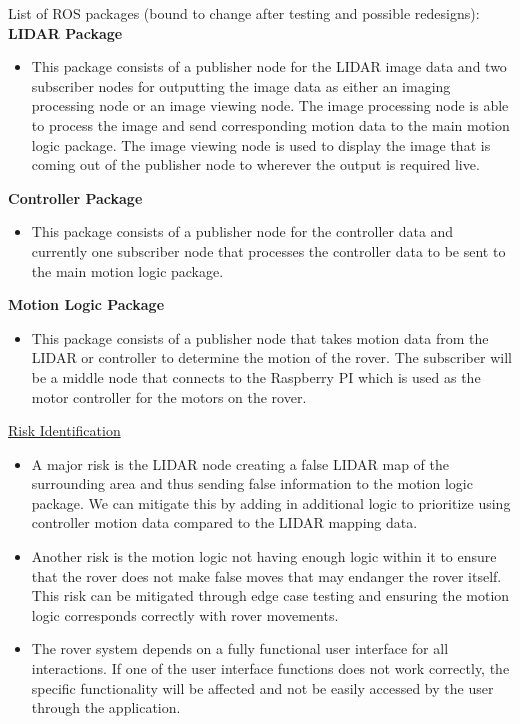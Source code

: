 \documentclass[a4paper, 10pt]{article}
\begin{document}
List of ROS packages (bound to change after testing and possible redesigns): \\

\textbf{LIDAR Package}
\begin{itemize}
\item
	This package consists of a publisher node for the LIDAR image data and two subscriber nodes for outputting the image data as either an imaging processing node or an image viewing node. The image processing node is able to process the image and send corresponding motion data to the main motion logic package. The image viewing node is used to display the image that is coming out of the publisher node to wherever the output is required live.
\end{itemize}

\textbf{Controller Package}

\begin{itemize}
\item
	This package consists of a publisher node for the controller data and currently one subscriber node that processes the controller data to be sent to the main motion logic package. 
\end{itemize}

\textbf{Motion Logic Package}

\begin{itemize}
\item
	This package consists of a publisher node that takes motion data from the LIDAR or controller to determine the motion of the rover. The subscriber will be a middle node that connects to the Raspberry PI which is used as the motor controller for the motors on the rover. 
\end{itemize}

\underline{Risk Identification}

\begin{itemize}
\item
	A major risk is the LIDAR node creating a false LIDAR map of the surrounding area and thus sending false information to the motion logic package. We can mitigate this by adding in additional logic to prioritize using controller motion data compared to the LIDAR mapping data. 

\item
	Another risk is the motion logic not having enough logic within it to ensure that the rover does not make false moves that may endanger the rover itself. This risk can be mitigated through edge case testing and ensuring the motion logic corresponds correctly with rover movements. 

\item
	The rover system depends on a fully functional user interface for all interactions. If one of the user interface functions does not work correctly, the specific functionality will be affected and not be easily accessed by the user through the application. 
\end{itemize}
\end{document}
